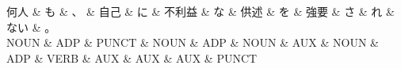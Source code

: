 \documentclass[tikz,border=5pt]{standalone}
\begin{document}
\normalsize
\begin{dependency}[edge unit distance=12.0pt]
    \begin{deptext}[column sep=1em]
        何人 \& も \& 、 \& 自己 \& に \& 不利益 \& な \& 供述 \& を \& 強要 \& さ \& れ \& ない \& 。\\
        NOUN \& ADP \& PUNCT \& NOUN \& ADP \& NOUN \& AUX \& NOUN \& ADP \& VERB \& AUX \& AUX \& AUX \& PUNCT\\
    \end{deptext}
\end{dependency}
\end{document}
